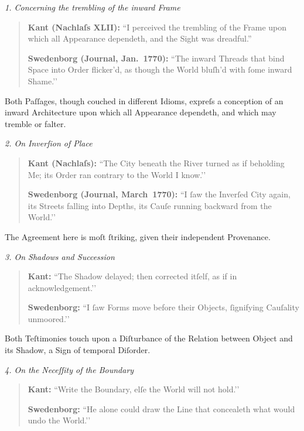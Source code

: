 \documentclass[12pt]{book}
\begin{document}
\medskip

\noindent\textit{1. Concerning the trembling of the inward Frame}

\begin{quote}
\textbf{Kant (Nachlaſs XLII):}
``I perceived the trembling of the Frame upon which all Appearance dependeth, and the Sight was dreadful.''

\textbf{Swedenborg (Journal, Jan.~1770):}
``The inward Threads that bind Space into Order flicker’d, as though the World bluſh’d with ſome inward Shame.’’
\end{quote}

Both Paſſages, though couched in different Idioms, expreſs a conception of an inward Architecture upon which all Appearance dependeth, and which may tremble or falter.

\medskip

\noindent\textit{2. On Inverſion of Place}

\begin{quote}
\textbf{Kant (Nachlaſs):}
``The City beneath the River turned as if beholding Me; its Order ran contrary to the World I know.’’

\textbf{Swedenborg (Journal, March~1770):}
``I ſaw the Inverſed City again, its Streets falling into Depths, its Cauſe running backward from the World.’’
\end{quote}

The Agreement here is moſt ſtriking, given their independent Provenance.

\medskip

\noindent\textit{3. On Shadows and Succession}

\begin{quote}
\textbf{Kant:}
``The Shadow delayed; then corrected itſelf, as if in acknowledgement.’’

\textbf{Swedenborg:}
``I ſaw Forms move before their Objects, ſignifying Cauſality unmoored.’’
\end{quote}

Both Teſtimonies touch upon a Diſturbance of the Relation between Object and its Shadow, a Sign of temporal Diſorder.

\medskip

\noindent\textit{4. On the Neceſſity of the Boundary}

\begin{quote}
\textbf{Kant:}
``Write the Boundary, elſe the World will not hold.’’

\textbf{Swedenborg:}
``He alone could draw the Line that concealeth what would undo the World.’’
\end{quote}
\end{document}
